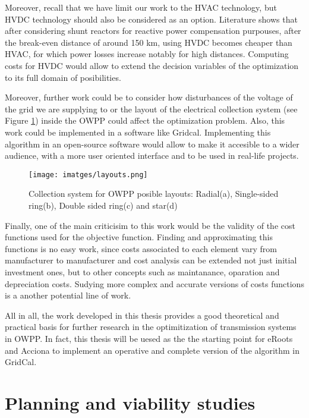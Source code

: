 \documentclass[a4paper,11pt, titlepage, twoside]{article}
\begin{document}
Moreover, recall that we have limit our work to the HVAC technology, but HVDC technology should also be considered as an option.
Literature \cite{paperbase} shows that after considering shunt reactors for reactive power compensation purpouses, after the break-even distance of around 150 km,
using HVDC becomes cheaper than HVAC, for which power losses increase notably for high distances. Computing costs for HVDC would allow to extend the decision variables of the optimization to its full
domain of posibilities.\par

Moreover, further work could be to consider how disturbances of the voltage of the grid we are supplying to or the layout of the electrical collection system (see Figure \ref{layouts_shape}) inside the OWPP could affect the optimization problem. 
Also, this work could be implemented in a software like Gridcal. Implementing this algorithm in an open-source software would allow to make it accesible to a wider audience, with a more user oriented interface and to be used in real-life projects.

\begin{figure}[H]
    \centering
    \texttt{[image: imatges/layouts.png]}
    \caption{Collection system for OWPP posible layouts: Radial(a), Single-sided ring(b), Double sided ring(c) and star(d) \cite{layouts_coll}}
    \label{layouts_shape}
\end{figure}

Finally, one of the main criticisim to this work would be the validity of the cost functions used for the objective function. Finding and approximating this functions is no easy work,
since costs associated to each element vary from manufacturer to manufacturer and cost analysis can be extended not just initial investment ones, but to other concepts such as maintanance, oparation and depreciation costs. Sudying more complex and accurate 
versions of costs functions is a another potential line of work.\par

All in all, the work developed in this thesis provides a good theoretical and practical basis for further research in the optimitization of transmission systems in OWPP. In fact, this thesis will be uesed as the the starting point for eRoots  and Acciona to implement an operative and complete version of the algorithm in GridCal.
\section{Planning and viability studies}\label{Planning}
\end{document}

